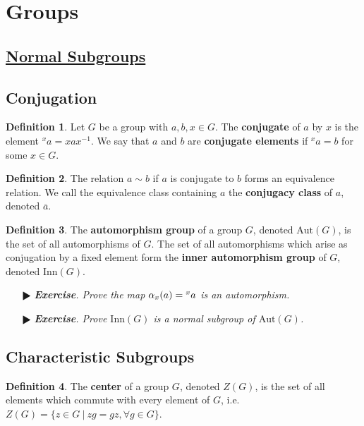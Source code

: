 \documentclass[11pt]{amsart}
\theoremstyle{definition}
\newtheorem*{definition*}{Definition}
\renewcommand\:{\colon}
\renewcommand\bar[1]{\overline{#1}}
\newcommand{\1}{\mathds{1}}
\newcommand{\Aut}{\text{Aut}}
\newcommand{\Inn}{\text{Inn}}
\newcommand{\exc}[1]{\vspace{-2.5pt}\begin{itemize}[leftmargin=15pt]\item[$\RHD$] \textit{\textbf{Exercise}. #1}\end{itemize}}
\begin{document}
\clearpage












\section{Groups}



\subsection*{\underline{Normal Subgroups}}

\subsection*{Conjugation}

\begin{definition*}
	Let $G$ be a group with $a, b, x \in G$. The \textbf{conjugate} of $a$ by $x$ is the element $^xa = xax^{-1}$. We say that $a$ and $b$ are \textbf{conjugate elements} if $^xa = b$ for some $x \in G$.
\end{definition*}

\begin{definition*}
	The relation $a \sim b$ if $a$ is conjugate to $b$ forms an equivalence relation. We call the equivalence class containing $a$ the \textbf{conjugacy class} of $a$, denoted $\bar{a}$.
\end{definition*}

\begin{definition*}
	The \textbf{automorphism group} of a group $G$, denoted $\Aut(G)$, is the set of all automorphisms of $G$. The set of all automorphisms which arise as conjugation by a fixed element form the \textbf{inner automorphism group} of $G$, denoted $\Inn(G)$.
\end{definition*}

\exc{Prove the map $\alpha_x(a) = \null^xa$ is an automorphism.}
\exc{Prove $\Inn(G)$ is a normal subgroup of $\Aut(G)$.}
\vskip20pt

\subsection*{Characteristic Subgroups}

\begin{definition*}
	The \textbf{center} of a group $G$, denoted $Z(G)$, is the set of all elements which commute with every element of $G$, i.e. $Z(G) = \{ z \in G \ | \ zg = gz, \forall g \in G\}$.
\end{definition*}
\end{document}
